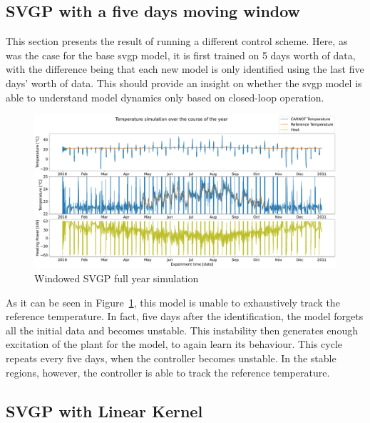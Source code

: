 \clearpage

\subsection{SVGP with a five days moving window}\label{sec:svgp_window}

This section presents the result of running a different control scheme. Here, as
was the case for the base \acrshort{svgp} model, it is first trained on 5 days
worth of data, with the difference being that each new model is only identified
using the last five days' worth of data. This should provide an insight on
whether the \acrshort{svgp} model is able to understand model dynamics only
based on closed-loop operation.

\begin{figure}[ht]
    \centering
    \includegraphics[width =
    \textwidth]{Plots/5_SVGP_480pts_480pts_window_12_averageYear_fullyear.pdf}
    \caption{Windowed SVGP full year simulation}
    \label{fig:SVGP_480window_fullyear_simulation}
\end{figure}

As it can be seen in Figure~\ref{fig:SVGP_480window_fullyear_simulation}, this
model is unable to exhaustively track the reference temperature. In fact, five days
after the identification, the model forgets all the initial data and becomes
unstable. This instability then generates enough excitation of the plant for the
model, to again learn its behaviour. This cycle repeats every five days, when the
controller becomes unstable. In the stable regions, however, the controller is
able to track the reference temperature. 

\clearpage

\subsection{SVGP with Linear Kernel}\label{sec:svgp_linear}

